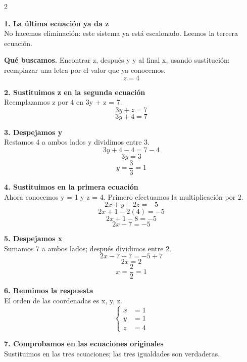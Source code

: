 \documentclass[11pt,a4paper,landscape]{article}
\begin{document}
\begin{multicols*}{2}
\noindent\begin{minipage}{\linewidth}\textbf{1. La última ecuación ya da z}\\[2pt]No hacemos eliminación: este sistema ya está escalonado. Leemos la tercera ecuación.
\par\smallskip\textbf{Qué buscamos.} Encontrar z, después y y al final x, usando sustitución: reemplazar una letra por el valor que ya conocemos.
\[z=4\]
\end{minipage}\par\medskip
\noindent\begin{minipage}{\linewidth}\textbf{2. Sustituimos z en la segunda ecuación}\\[2pt]Reemplazamos z por 4 en 3y + z = 7.
\[3y+z=7\]
\[3y+4=7\]
\end{minipage}\par\medskip
\noindent\begin{minipage}{\linewidth}\textbf{3. Despejamos y}\\[2pt]Restamos 4 a ambos lados y dividimos entre 3.
\[3y+4-4=7-4\]
\[3y=3\]
\[y=\frac{3}{3}=1\]
\end{minipage}\par\medskip
\noindent\begin{minipage}{\linewidth}\textbf{4. Sustituimos en la primera ecuación}\\[2pt]Ahora conocemos y = 1 y z = 4. Primero efectuamos la multiplicación por 2.
\[2x+y-2z=-5\]
\[2x+1-2(4)=-5\]
\[2x+1-8=-5\]
\[2x-7=-5\]
\end{minipage}\par\medskip
\noindent\begin{minipage}{\linewidth}\textbf{5. Despejamos x}\\[2pt]Sumamos 7 a ambos lados; después dividimos entre 2.
\[2x-7+7=-5+7\]
\[2x=2\]
\[x=\frac{2}{2}=1\]
\end{minipage}\par\medskip
\noindent\begin{minipage}{\linewidth}\textbf{6. Reunimos la respuesta}\\[2pt]El orden de las coordenadas es x, y, z.
\[\left\{\begin{aligned}x&=1\\y&=1\\z&=4\end{aligned}\right.\]
\end{minipage}\par\medskip
\noindent\begin{minipage}{\linewidth}\textbf{7. Comprobamos en las ecuaciones originales}\\[2pt]Sustituimos en las tres ecuaciones; las tres igualdades son verdaderas.

\end{minipage}
\end{multicols*}
\end{document}
